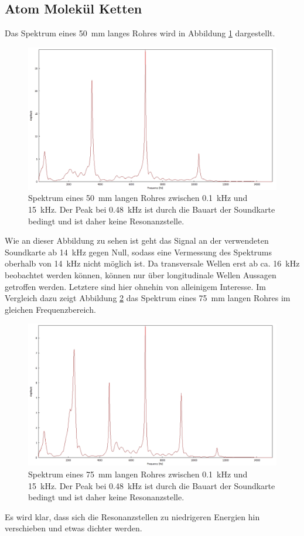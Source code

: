 \subsection{Atom Molekül Ketten}
\label{subsec:Atom Molekül Ketten}
Das Spektrum eines 50~mm langes Rohres wird in Abbildung \ref{fig:4b_1} dargestellt.
\begin{figure}
\centering
\includegraphics[width=\textwidth]{content/messungen/Chapter4b/4b_1.jpg}
\caption{Spektrum eines 50~mm langen Rohres zwischen 0.1~kHz und 15~kHz. Der Peak bei 0.48~kHz ist durch die Bauart der Soundkarte bedingt und ist daher keine Resonanzstelle.}
\label{fig:4b_1}
\end{figure}
Wie an dieser Abbildung zu sehen ist geht das Signal an der verwendeten Soundkarte ab 14~kHz gegen Null, sodass eine Vermessung des Spektrums oberhalb von 14~kHz nicht möglich ist. 
Da transversale Wellen erst ab ca. 16~kHz beobachtet werden können, können nur über longitudinale Wellen Aussagen getroffen werden.
Letztere sind hier ohnehin von alleinigem Interesse.
Im Vergleich dazu zeigt Abbildung \ref{fig:4b_2} das Spektrum eines 75~mm langen Rohres im gleichen Frequenzbereich.
\begin{figure}
\centering
\includegraphics[width=\textwidth]{content/messungen/Chapter4b/4b_2.jpg}
\caption{Spektrum eines 75~mm langen Rohres zwischen 0.1~kHz und 15~kHz. Der Peak bei 0.48~kHz ist durch die Bauart der Soundkarte bedingt und ist daher keine Resonanzstelle.}
\label{fig:4b_2}
\end{figure}
Es wird klar, dass sich die Resonanzstellen zu niedrigeren Energien hin verschieben und etwas dichter werden.

